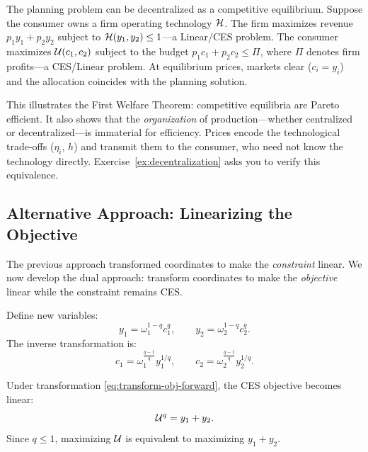 \begin{remark}[Decentralization]
\label{rem:decentralization}
The planning problem can be decentralized as a competitive equilibrium. Suppose the consumer owns a firm operating technology $\mathcal{H}$. The firm maximizes revenue $p_1 y_1 + p_2 y_2$ subject to $\mathcal{H}(y_1, y_2) \leq 1$---a Linear/CES problem. The consumer maximizes $\mathcal{U}(c_1, c_2)$ subject to the budget $p_1 c_1 + p_2 c_2 \leq \Pi$, where $\Pi$ denotes firm profits---a CES/Linear problem. At equilibrium prices, markets clear ($c_i = y_i$) and the allocation coincides with the planning solution.

This illustrates the First Welfare Theorem: competitive equilibria are Pareto efficient. It also shows that the \emph{organization} of production---whether centralized or decentralized---is immaterial for efficiency. Prices encode the technological trade-offs ($\eta_i$, $h$) and transmit them to the consumer, who need not know the technology directly. Exercise~\ref{ex:decentralization} asks you to verify this equivalence.
\end{remark}

\subsection{Alternative Approach: Linearizing the Objective}
\label{subsec:linear-objective}

The previous approach transformed coordinates to make the \emph{constraint} linear. We now develop the dual approach: transform coordinates to make the \emph{objective} linear while the constraint remains CES.

\begin{definition}
\label{def:obj-linear-transform}
Define new variables:
\begin{equation}
\label{eq:transform-obj-forward}
y_1 = \omega_1^{1-q} c_1^{q}, \qquad y_2 = \omega_2^{1-q} c_2^{q}.
\end{equation}
The inverse transformation is:
\begin{equation}
\label{eq:transform-obj-inverse}
c_1 = \omega_1^{\frac{q-1}{q}} y_1^{1/q}, \qquad c_2 = \omega_2^{\frac{q-1}{q}} y_2^{1/q}.
\end{equation}
\end{definition}

\begin{proposition}
\label{prop:linear-objective}
Under transformation \eqref{eq:transform-obj-forward}, the CES objective becomes linear:
\begin{equation}
\mathcal{U}^q = y_1 + y_2.
\end{equation}
Since $q \leq 1$, maximizing $\mathcal{U}$ is equivalent to maximizing $y_1 + y_2$.
\end{proposition}

